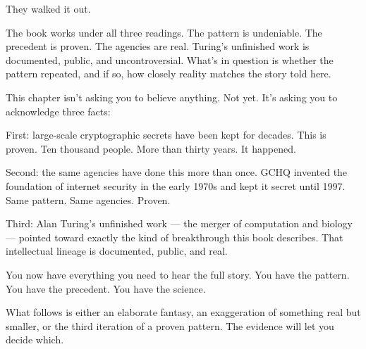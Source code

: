 They walked it out.

\vspace{0.5cm}

The book works under all three readings. The pattern is undeniable. The precedent is proven. The agencies are real. Turing's unfinished work is documented, public, and uncontroversial. What's in question is whether the pattern repeated, and if so, how closely reality matches the story told here.

This chapter isn't asking you to believe anything. Not yet. It's asking you to acknowledge three facts:

First: large-scale cryptographic secrets have been kept for decades. This is proven. Ten thousand people. More than thirty years. It happened.

Second: the same agencies have done this more than once. GCHQ invented the foundation of internet security in the early 1970s and kept it secret until 1997. Same pattern. Same agencies. Proven.

Third: Alan Turing's unfinished work --- the merger of computation and biology --- pointed toward exactly the kind of breakthrough this book describes. That intellectual lineage is documented, public, and real.

You now have everything you need to hear the full story. You have the pattern. You have the precedent. You have the science.

What follows is either an elaborate fantasy, an exaggeration of something real but smaller, or the third iteration of a proven pattern. The evidence will let you decide which.

\chapterreturn
